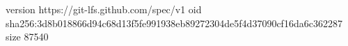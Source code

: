 version https://git-lfs.github.com/spec/v1
oid sha256:3d8b018866d94c68d13f5fe991938eb89272304de5f4d37090cf16da6c362287
size 87540
